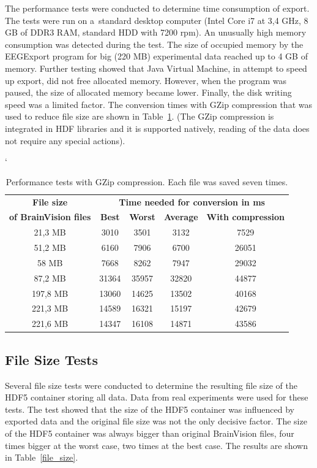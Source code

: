 \documentclass[conference]{IEEEtran}
\begin{document}
The performance tests were conducted to determine time consumption of export. The tests were run on a~standard desktop computer (Intel Core i7 at 3,4 GHz, 8 GB of DDR3 RAM, standard HDD with 7200 rpm). An unusually high memory consumption was detected during the test. The size of occupied memory by the EEGExport program for big (220 MB) experimental data reached up to 4 GB of memory. Further testing showed that Java Virtual Machine, in attempt to speed up export, did not free allocated memory. However, when the program was paused, the size of allocated memory became lower. Finally, the disk writing speed was a limited factor. The conversion times with GZip compression that was used to reduce file size are shown in Table~\ref{speed_test}. (The GZip compression is integrated in HDF libraries and it is supported natively, reading of the data does not require any special actions).

\begin{table}
	\catcode`
	\centering
	\caption{Performance tests with GZip compression. Each file was saved seven times.}
	\label{speed_test}
	\begin{tabular}{|c|c|c|c|c|}
		\hline
		\textbf{File size} & \multicolumn{4}{c|}{\textbf{Time needed for conversion in ms}}\\
		\cline{2-5}		
		\textbf{ of BrainVision files}	&\textbf{Best} & \textbf{Worst} & \textbf{Average} & \textbf{With compression}\\
		\hline
		\hline 21,3 MB & 3010 & 3501  & 3132& 7529 \\ 	
		\hline 51,2 MB & 6160  & 7906 & 6700 & 26051\\
		\hline 58 MB & 7668 &  8262 &  7947& 29032\\
		\hline 87,2 MB & 31364 & 35957 & 32820& 44877\\
		\hline 197,8 MB & 13060  & 14625 &  13502& 40168\\ 		
		\hline 221,3 MB & 14589 & 16321 & 15197& 42679 \\
		\hline 221,6 MB & 14347  & 16108 & 14871& 43586\\
		\hline
	\end{tabular}
\end{table}


\subsection{File Size Tests}
Several file size tests were conducted to determine the resulting file size of the HDF5 container storing all data. Data from real experiments were used for these tests. The test showed that the size of the HDF5 container was influenced by exported data and the original file size was not the only decisive factor. The size of the HDF5 container was always bigger than original BrainVision files, four times bigger at the worst case, two times at the best case. The results are shown in Table~\ref{file_size}.
\end{document}
